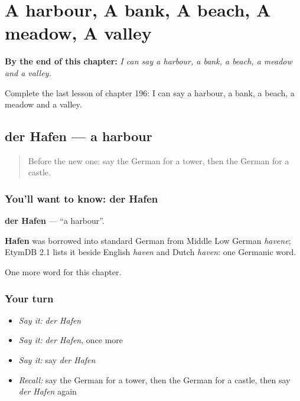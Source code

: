 
\chapter{A harbour, A bank, A beach, A meadow, A valley}
\label{ch:ge-a-harbour-a-bank-a-beach-a-meadow-a-valley}

\begin{chapteropening}
\textbf{By the end of this chapter:} \emph{I can say a harbour, a bank, a beach, a meadow and a valley.}

Complete the last lesson of chapter 196: I can say a harbour, a bank, a beach, a meadow and a valley.
\end{chapteropening}

\section[der Hafen]{der Hafen — a harbour}

\label{lesson:GE-C196-hafen}



\begin{quote}
Before the new one: say the German for a tower, then the German for a castle.
\end{quote}

\subsection*{You'll want to know: der Hafen}
\textbf{der Hafen} — \textquotedblleft{}a harbour\textquotedblright{}.

\begin{cousinweb}
\textbf{Hafen} was borrowed into standard German from Middle Low German \emph{havene}; EtymDB 2.1 lists it beside English \emph{haven} and Dutch \emph{haven}: one Germanic word.
\end{cousinweb}

\begin{grammarlens}[title={What you've built}]
One more word for this chapter.
\end{grammarlens}

\subsection*{Your turn}
\begin{itemize}
\raggedright
  \item \emph{Say it:} \emph{der Hafen}
  \item \emph{Say it:} \emph{der Hafen}, once more
  \item \emph{Say it:} say \emph{der Hafen}
  \item \emph{Recall:} say the German for a tower, then the German for a castle, then say \emph{der Hafen} again
\end{itemize}


